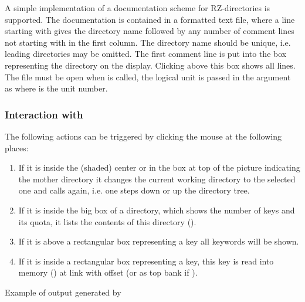 A simple implementation of a documentation scheme for RZ-directories is
supported. 
The documentation is contained in a formatted text file,
where a line starting with  gives the directory name followed by
any number of comment lines not starting with  in the first column. 
The  directory name should be unique, i.e. leading directories may be 
omitted. 
The first  comment line is put into the box representing the
directory on the display. 
Clicking above this box shows all lines.
The file must be open when  is called, the logical unit is passed
in the  argument as  where  is the unit number. 
 
 
\subsubsection*{Interaction with }
 
The following actions can be triggered by clicking the mouse at the
following places:
 
\begin{enumerate}
\item If it is inside the (shaded) center or in the
      box at top of the picture indicating the mother directory
      it changes the current working directory to the selected one
      and calls  again, i.e. one steps down or up the directory tree.
\item If it is inside the big box of a directory, which shows the number of
      keys and its quota, it lists the contents of this directory ().
\item If it is above a rectangular box representing a key all keywords will be shown.
\item If it is inside a rectangular
      box representing a key, this key is read into memory () at link
       with offset  (or as top bank if ).
\end{enumerate}
 
\newpage
 
\begin{Fighere}
\begin{center}
\end{center} 
\caption[Example of output generated by {\tt DZDIRZ}]{Example of output generated by }
\end{Fighere}
 
 
